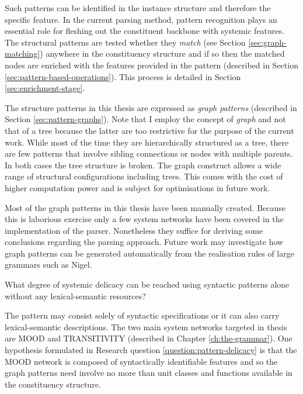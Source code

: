 Such patterns can be identified in the instance structure and therefore the specific feature. In the current parsing method, pattern recognition plays an essential role for fleshing out the constituent backbone with systemic features. The structural patterns are tested whether they \textit{match} (see Section \ref{sec:graph-matching}) anywhere in the constituency structure and if so then the matched nodes are enriched with the features provided in the pattern (described in Section \ref{sec:pattern-based-operations}). This process is detailed in Section \ref{sec:enrichment-stage}. 

The structure patterns in this thesis are expressed as \textit{graph patterns} (described in Section \ref{sec:pattern-graphs}). Note that I employ the concept of \textit{graph} and not that of a tree because the latter are too restrictive for the purpose of the current work. While most of the time they are hierarchically structured as a tree, there are few patterns that involve sibling connections or nodes with multiple parents. In both cases the tree structure is broken. The graph construct allows a wide range of structural configurations including trees. This comes with the cost of higher computation power and is subject for optimisations in future work. 


Most of the graph patterns in this thesis have been manually created. Because this is laborious exercise only a few system networks have been covered in the implementation of the parser. Nonetheless they suffice for deriving some conclusions regarding the parsing approach. Future work may investigate how graph patterns can be generated automatically from the realisation rules of large grammars such as Nigel. 

\begin{question}\label{question:pattern-delicacy}
    What degree of systemic delicacy can be reached using syntactic patterns alone without any lexical-semantic resources?
\end{question}

The pattern may consist solely of syntactic specifications or it can also carry lexical-semantic descriptions. 
The two main system networks targeted in thesis are MOOD and TRANSITIVITY (described in Chapter \ref{ch:the-grammar}). One hypothesis formulated in Research question \ref{question:pattern-delicacy} is that the MOOD network is composed of syntactically identifiable features and so the graph patterns need involve no more than unit classes and functions available in the constituency structure. 

